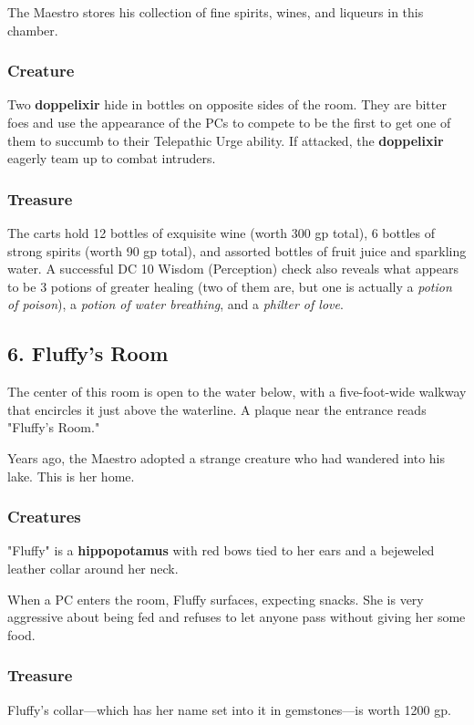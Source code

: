 \documentclass[10pt,a4paper,twoside,bg=print,twocolumn,openany,nodeprecatedcode]{dndbook}
\begin{document}
The Maestro stores his collection of fine spirits, wines, and liqueurs in this chamber.

\subsubsection{Creature}
Two \textbf{doppelixir} hide in bottles on opposite sides of the room. They are bitter foes and use the appearance of the PCs to compete to be the first to get one of them to succumb to their Telepathic Urge ability. If attacked, the \textbf{doppelixir} eagerly team up to combat intruders.

\subsubsection{Treasure}
The carts hold 12 bottles of exquisite wine (worth 300 gp total), 6 bottles of strong spirits (worth 90 gp total), and assorted bottles of fruit juice and sparkling water. A successful DC 10 Wisdom (Perception) check also reveals what appears to be 3 potions of greater healing (two of them are, but one is actually a \textit{potion of poison}), a \textit{potion of water breathing}, and a \textit{philter of love}.

\subsection{6. Fluffy's Room}
\begin{DndReadAloud}{}
The center of this room is open to the water below, with a five-foot-wide walkway that encircles it just above the waterline. A plaque near the entrance reads "Fluffy's Room."

\end{DndReadAloud}

Years ago, the Maestro adopted a strange creature who had wandered into his lake. This is her home.

\subsubsection{Creatures}
"Fluffy" is a \textbf{hippopotamus} with red bows tied to her ears and a bejeweled leather collar around her neck.

When a PC enters the room, Fluffy surfaces, expecting snacks. She is very aggressive about being fed and refuses to let anyone pass without giving her some food.

\subsubsection{Treasure}
Fluffy's collar—which has her name set into it in gemstones—is worth 1200 gp.
\end{document}
